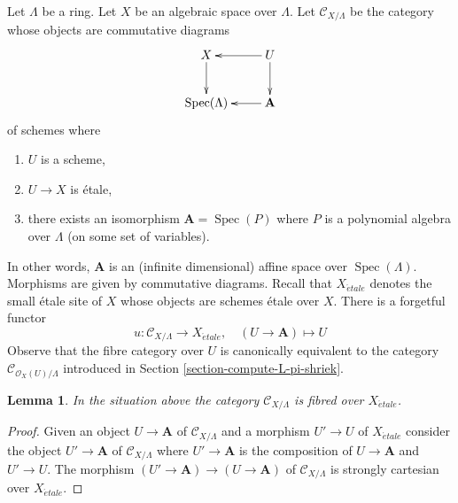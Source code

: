 \documentclass{stacks-project}
\theoremstyle{plain}
\newtheorem{lemma}[subsection]{Lemma}
\theoremstyle{definition}
\theoremstyle{remark}
\numberwithin{equation}{subsection}
\def\Spec{\mathop{\mathrm{Spec}}}
\def\etale{{\acute{e}tale}}
\begin{document}
\medskip\noindent
Let $\Lambda$ be a ring. Let $X$ be an algebraic space over $\Lambda$.
Let $\mathcal{C}_{X/\Lambda}$ be the category whose objects are
commutative diagrams
\begin{equation}
\label{equation-object-space}
\vcenter{
\xymatrix{
X \ar[d] & U \ar[l] \ar[d] \\
\Spec(\Lambda) & \mathbf{A} \ar[l]
}
}
\end{equation}
of schemes where
\begin{enumerate}
\item $U$ is a scheme,
\item $U \to X$ is \'etale,
\item there exists an isomorphism $\mathbf{A} = \Spec(P)$
where $P$ is a polynomial algebra over $\Lambda$ (on some set
of variables).
\end{enumerate}
In other words, $\mathbf{A}$ is an (infinite dimensional) affine space over
$\Spec(\Lambda)$. Morphisms are given by commutative diagrams.
Recall that $X_\etale$ denotes the small \'etale site of $X$
whose objects are schemes \'etale over $X$.
There is a forgetful functor
$$
u : \mathcal{C}_{X/\Lambda} \to X_\etale,
\quad
(U \to \mathbf{A}) \mapsto U
$$
Observe that the fibre category over $U$ is canonically equivalent
to the category $\mathcal{C}_{\mathcal{O}_X(U)/\Lambda}$ introduced
in Section \ref{section-compute-L-pi-shriek}.

\begin{lemma}
\label{lemma-category-fibred-space}
In the situation above the category
$\mathcal{C}_{X/\Lambda}$ is fibred over $X_\etale$.
\end{lemma}

\begin{proof}
Given an object $U \to \mathbf{A}$ of $\mathcal{C}_{X/\Lambda}$ and a morphism
$U' \to U$ of $X_\etale$ consider the object $U' \to \mathbf{A}$ of
$\mathcal{C}_{X/\Lambda}$ where $U' \to \mathbf{A}$ is the composition of
$U \to \mathbf{A}$
and $U' \to U$. The morphism $(U' \to \mathbf{A}) \to (U \to \mathbf{A})$ of
$\mathcal{C}_{X/\Lambda}$ is strongly cartesian over $X_\etale$.
\end{proof}
\end{document}
